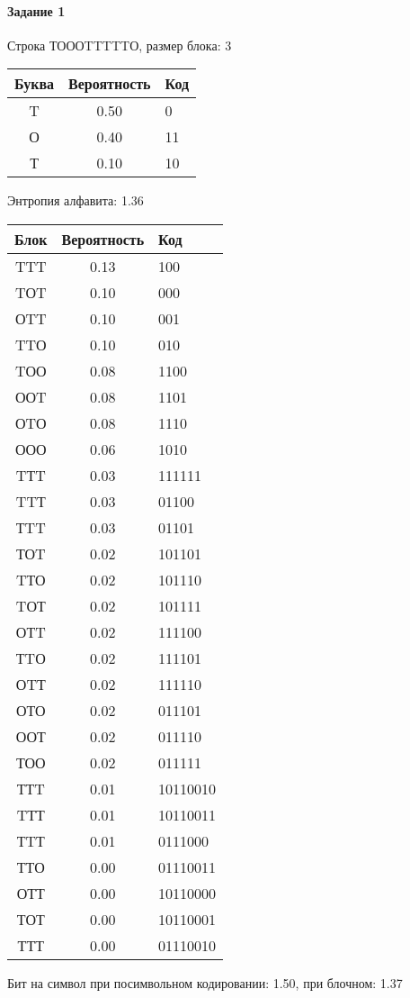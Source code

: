 \documentclass[a4paper, 12pt]{article}
\begin{document}
\paragraph{Задание 1}

Строка ТОООTTTTTО, размер блока: 3
\begin{center}
 \begin{tabular}{ |c|c|l| } 
  \hline
     Буква & Вероятность & Код\\ \hline
T & 0.50 & 0\\\hline
О & 0.40 & 11\\\hline
Т & 0.10 & 10
\\ \hline \end{tabular}
\end{center}
Энтропия алфавита: 1.36
\begin{center}
 \begin{tabular}{ |c|c|l| } 
  \hline
     Блок & Вероятность & Код\\ \hline
TTT & 0.13 & 100\\\hline
TОT & 0.10 & 000\\\hline
ОTT & 0.10 & 001\\\hline
TTО & 0.10 & 010\\\hline
TОО & 0.08 & 1100\\\hline
ООT & 0.08 & 1101\\\hline
ОTО & 0.08 & 1110\\\hline
ООО & 0.06 & 1010\\\hline
TТT & 0.03 & 111111\\\hline
TTТ & 0.03 & 01100\\\hline
ТTT & 0.03 & 01101\\\hline
ТОT & 0.02 & 101101\\\hline
TТО & 0.02 & 101110\\\hline
TОТ & 0.02 & 101111\\\hline
ОТT & 0.02 & 111100\\\hline
ТTО & 0.02 & 111101\\\hline
ОTТ & 0.02 & 111110\\\hline
ОТО & 0.02 & 011101\\\hline
ООТ & 0.02 & 011110\\\hline
ТОО & 0.02 & 011111\\\hline
ТТT & 0.01 & 10110010\\\hline
TТТ & 0.01 & 10110011\\\hline
ТTТ & 0.01 & 0111000\\\hline
ТТО & 0.00 & 01110011\\\hline
ОТТ & 0.00 & 10110000\\\hline
ТОТ & 0.00 & 10110001\\\hline
ТТТ & 0.00 & 01110010
\\ \hline \end{tabular}
\end{center}
Бит на символ при посимвольном кодировании: 1.50, при блочном: 1.37
\end{document}
